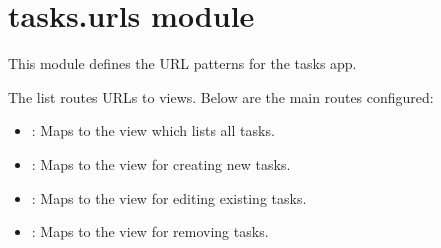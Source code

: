 \documentclass[letterpaper,10pt,english]{sphinxmanual}
\begin{document}
\begin{fulllineitems}

\begin{fulllineitems}
\label{\detokenize{tasks:tasks.serializers.TaskSerializer.validated_data}}
\pysigstartsignatures
{}
\pysigstopsignatures
\end{fulllineitems}


\begin{fulllineitems}
\label{\detokenize{tasks:tasks.serializers.TaskSerializer.validators}}
\pysigstartsignatures
{}
\pysigstopsignatures
\end{fulllineitems}


\end{fulllineitems}



\section{tasks.urls module}
\label{\detokenize{tasks:tasks-urls-module}}
\sphinxAtStartPar
This module defines the URL patterns for the tasks app.

\sphinxAtStartPar
The  list routes URLs to views. Below are the main routes configured:
\begin{itemize}
\item {} 
\sphinxAtStartPar
\sphinxstylestrong{/}: Maps to the  view which lists all tasks.

\item {} 
\sphinxAtStartPar
{}: Maps to the  view for creating new tasks.

\item {} 
\sphinxAtStartPar
{}: Maps to the  view for editing existing tasks.

\item {} 
\sphinxAtStartPar
{}: Maps to the  view for removing tasks.

\end{itemize}
\label{\detokenize{tasks:module-tasks.urls}}
\end{document}
